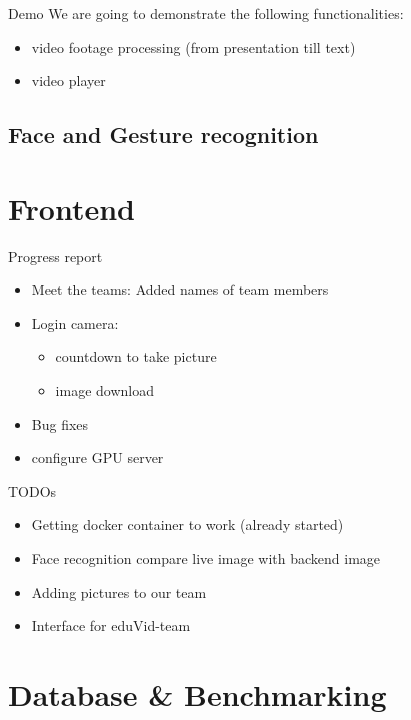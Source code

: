 \documentclass[xcolor=x11names,table]{beamer}
\begin{document}
\begin{frame}{Demo}
We are going to demonstrate the following functionalities:
\begin{itemize}
    \item video footage processing (from presentation till text)
    \item video player
\end{itemize}
\end{frame}

\title[\textcolor{white}{Nurali}]{}
\subsection{Face and Gesture recognition}

\section{Frontend}
\begin{frame}{Progress report}
\begin{itemize}
    \item Meet the teams: Added names of team members
    \item Login camera: 
    \begin{itemize}
        \item countdown to take picture
        \item image download
    \end{itemize}
    \item Bug fixes
    \item configure GPU server
\end{itemize}
\end{frame}

\begin{frame}{TODOs}
\begin{itemize}
    \item Getting docker container to work (already started)
    \item Face recognition \arrow compare live image with backend image
    \item Adding pictures to our team
    \item Interface for eduVid-team
\end{itemize}
\end{frame}

\title[\textcolor{white}{Mike}]{}
\section{Database \& Benchmarking}
\end{document}

